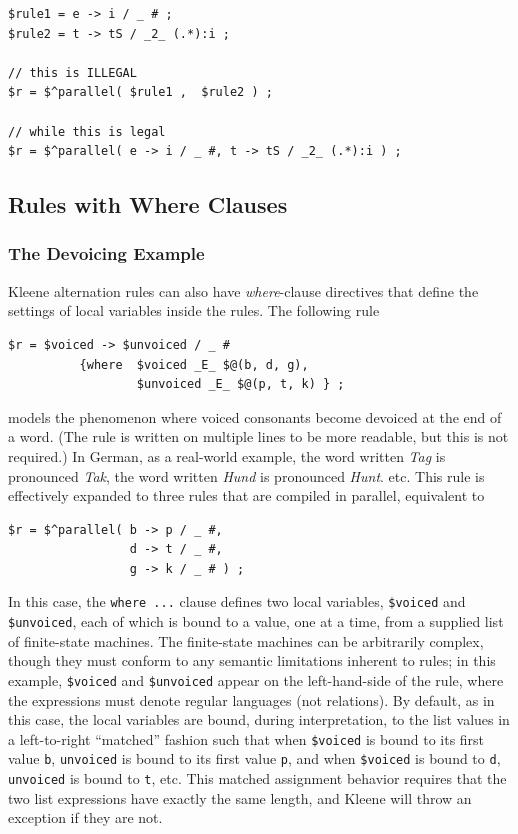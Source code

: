 \begin{Verbatim}
$rule1 = e -> i / _ # ;
$rule2 = t -> tS / _2_ (.*):i ;

// this is ILLEGAL
$r = $^parallel( $rule1 ,  $rule2 ) ;

// while this is legal
$r = $^parallel( e -> i / _ #, t -> tS / _2_ (.*):i ) ;
\end{Verbatim}

\subsection{Rules with Where Clauses}

\subsubsection{The Devoicing Example}

Kleene alternation rules can also have \emph{where}-clause directives that define the settings of local variables inside the rules.  The following rule

\begin{Verbatim}
$r = $voiced -> $unvoiced / _ # 
          {where  $voiced _E_ $@(b, d, g), 
                  $unvoiced _E_ $@(p, t, k) } ;
\end{Verbatim}

\noindent
models the phenomenon where voiced consonants become devoiced at the end of a word.  (The rule is written on multiple lines to be
more readable, but this is not required.) In German, as a real-world example, the word
written \emph{Tag} is pronounced \emph{Tak}, the word written \emph{Hund} is pronounced
\emph{Hunt}. etc.  This rule is effectively expanded to
three rules that are compiled in parallel, equivalent to

\begin{Verbatim}
$r = $^parallel( b -> p / _ #, 
                 d -> t / _ #, 
                 g -> k / _ # ) ;
\end{Verbatim}

\noindent
In this case, the \texttt{{where ...}} clause defines two local variables,
\verb!$voiced! and \verb!$unvoiced!, each of which is bound to a value, one at a
time, from a supplied list of finite-state machines.  The finite-state machines can be
arbitrarily complex, though they must conform to any semantic limitations
inherent to rules; in this example, \verb!$voiced! and \verb!$unvoiced! appear on
the left-hand-side of the rule, where the expressions must denote regular
languages (not relations).  By default, as in this case, the local variables are
bound, during interpretation, to the list values in a left-to-right ``matched''
fashion such that when \verb!$voiced! is bound to its first value \verb!b!, \verb!unvoiced! is
bound to its first value \verb!p!, and when \verb!$voiced! is bound to \verb!d!, \verb!unvoiced!
is bound to \verb!t!, etc.  This matched assignment behavior requires that the
two list expressions have exactly the same length, and Kleene will throw an
exception if they are not.  

